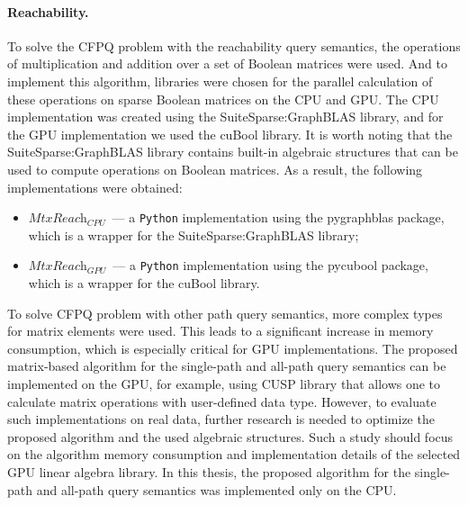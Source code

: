 \paragraph{Reachability.} %
To solve the CFPQ problem with the reachability query semantics, the operations of multiplication and addition over a set of Boolean matrices were used. And to implement this algorithm, libraries were chosen for the parallel calculation of these operations on sparse Boolean matrices on the CPU and GPU. The CPU implementation was created using the SuiteSparse:GraphBLAS library, and for the GPU implementation we used the cuBool library. It is worth noting that the SuiteSparse:GraphBLAS library contains built-in algebraic structures that can be used to compute operations on Boolean matrices. As a result, the following implementations were obtained:
\begin{itemize}
    \item $\textit{MtxReach}_{\textit{CPU}}$~--- a \texttt{Python} implementation using the pygraphblas package, which is a wrapper for the SuiteSparse:GraphBLAS library;
    \item $\textit{MtxReach}_{\textit{GPU}}$~--- a \texttt{Python} implementation using the pycubool package, which is a wrapper for the cuBool library.
\end{itemize}

To solve CFPQ problem with other path query semantics, more complex types for matrix elements were used. This leads to a significant increase in memory consumption, which is especially critical for GPU implementations. The proposed matrix-based algorithm for the single-path and all-path query semantics can be implemented on the GPU, for example, using CUSP library that allows one to calculate matrix operations with user-defined data type. However, to evaluate such implementations on real data, further research is needed to optimize the proposed algorithm and the used algebraic structures. Such a study should focus on the algorithm memory consumption and implementation details of the selected GPU linear algebra library. In this thesis, the proposed algorithm for the single-path and all-path query semantics was implemented only on the CPU.

